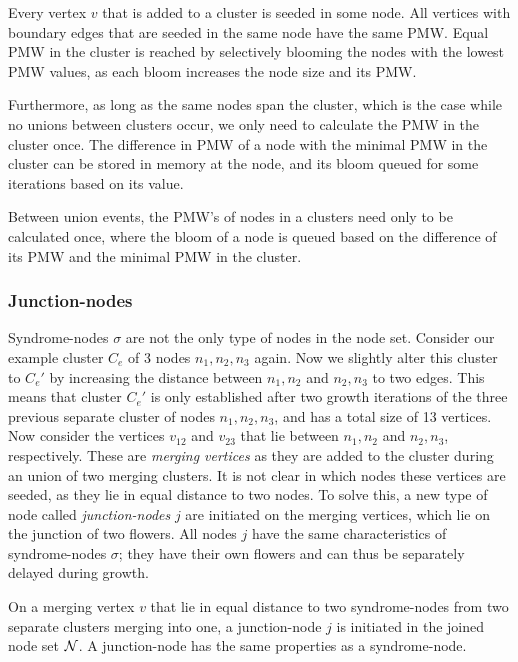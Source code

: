 \begin{theorem}\label{th:balancedbloom}
  Every vertex $v$ that is added to a cluster is seeded in some node. All vertices with boundary edges that are seeded in the same node have the same PMW. Equal PMW in the cluster is reached by selectively blooming the nodes with the lowest PMW values, as each bloom increases the node size and its PMW.
\end{theorem}

Furthermore, as long as the same nodes span the cluster, which is the case while no unions between clusters occur, we only need to calculate the PMW in the cluster once. The difference in PMW of a node with the minimal PMW in the cluster can be stored in memory at the node, and its bloom queued for some iterations based on its value.

\begin{lemma}\label{lem:calconce}
  Between union events, the PMW's of nodes in a clusters need only to be calculated once, where the bloom of a node is queued based on the difference of its PMW and the minimal PMW in the cluster.
\end{lemma}

\subsubsection{Junction-nodes}

Syndrome-nodes $\sigma$ are not the only type of nodes in the node set. Consider our example cluster $C_e$ of 3 nodes $n_1, n_2, n_3$ again. Now we slightly alter this cluster to $C_e'$ by increasing the distance between $n_1, n_2$ and $n_2, n_3$ to two edges. This means that cluster $C_e'$ is only established after two growth iterations of the three previous separate cluster of nodes $n_1, n_2, n_3$, and has a total size of 13 vertices. Now consider the vertices $v_{12}$ and $v_{23}$ that lie between $n_1, n_2$ and $n_2, n_3$, respectively. These are \emph{merging vertices} as they are added to the cluster during an union of two merging clusters. It is not clear in which nodes these vertices are seeded, as they lie in equal distance to two nodes. To solve this, a new type of node called \emph{junction-nodes} $j$ are initiated on the merging vertices, which lie on the junction of two flowers. All nodes $j$ have the same characteristics of syndrome-nodes $\sigma$; they have their own flowers and can thus be separately delayed during growth.

\begin{lemma}\label{lem:junctionode}
  On a merging vertex $v$ that lie in equal distance to two syndrome-nodes from two separate clusters merging into one, a junction-node $j$ is initiated in the joined node set $\mathcal{N}$. A junction-node has the same properties as a syndrome-node.
\end{lemma}

